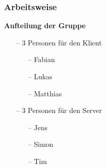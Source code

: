 \documentclass[aspectratio=1610]{beamer}
\begin{document}
    \begin{frame}[plain]
        \frametitle{\textbf{Arbeitsweise}}
            \textbf{Aufteilung der Gruppe}
            \begin{itemize}
                \setlength\itemsep{0.3em}
                \item[--] 3 Personen für den Klient
                    \begin{itemize}
                        \item[--] Fabian
                        \item[--] Lukas
                        \item[--] Matthias
                    \end{itemize}
                \item[--] 3 Personen für den Server
                    \begin{itemize}
                        \item[--] Jens
                        \item[--] Simon
                        \item[--] Tim
                    \end{itemize}
            \end{itemize}
    \end{frame}
\end{document}
